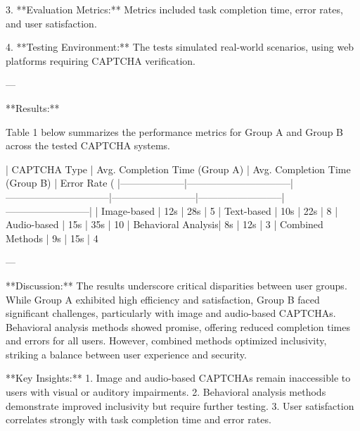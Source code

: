 3. **Evaluation Metrics:**  
   Metrics included task completion time, error rates, and user satisfaction.  

4. **Testing Environment:**  
   The tests simulated real-world scenarios, using web platforms requiring CAPTCHA verification.  

---

**Results:**  

Table 1 below summarizes the performance metrics for Group A and Group B across the tested CAPTCHA systems.  

| CAPTCHA Type       | Avg. Completion Time (Group A) | Avg. Completion Time (Group B) | Error Rate (%
|--------------------|--------------------------------|--------------------------------|--------------------------|--------------------------|--------------------------|
| Image-based        | 12s                           | 28s                           | 5%
| Text-based         | 10s                           | 22s                           | 8%
| Audio-based        | 15s                           | 35s                           | 10%
| Behavioral Analysis| 8s                            | 12s                           | 3%
| Combined Methods   | 9s                            | 15s                           | 4%

---

**Discussion:**  
The results underscore critical disparities between user groups. While Group A exhibited high efficiency and satisfaction, Group B faced significant challenges, particularly with image and audio-based CAPTCHAs. Behavioral analysis methods showed promise, offering reduced completion times and errors for all users. However, combined methods optimized inclusivity, striking a balance between user experience and security.  

**Key Insights:**  
1. Image and audio-based CAPTCHAs remain inaccessible to users with visual or auditory impairments.  
2. Behavioral analysis methods demonstrate improved inclusivity but require further testing.  
3. User satisfaction correlates strongly with task completion time and error rates.  

